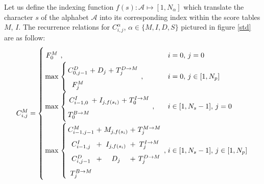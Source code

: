 \documentclass[a4paper,10pt,twoside]{scrartcl}
\newcommand{\A}{\mathcal{A}}
\begin{document}
Let us define the indexing function $f(s): \A \mapsto [1,N_\alpha]$ which translate the character $s$ of the alphabet $\A$ 
into its corresponding index within the score tables $M$, $I$.   
The recurrence relations for $C^\alpha_{i,j}$, $\alpha \in \{M,I,D,S\}$ pictured in figure \ref{std} are as follow:
\begin{equation} \label{std1} \arraycolsep=1.4pt\def\arraystretch{1.7}
	C_{i,j}^{M} = \left \{
		\begin{array}{c l l}
		  F^{M}_0 &,& i = 0,\, j = 0\\
		  
		  \max & \left \{
		  \begin{array} {ccccc}
		  C_{0,j-1}^{D}   &+& D_{j} &+& T^{D \rightarrow M}_j \\
		  F^{M}_j \\
		  \end{array} \right. , & i = 0,\, j \in [1,N_p]\\
		  
		  \max & \left \{
		  \begin{array} {ccccc}
		  C_{i-1,0}^{I}   &+& I_{j, f(s_i)} &+& T^{I \rightarrow M}_0 \\
		  T^{B \rightarrow M}_0 \\
		  \end{array} \right. , & i \in [1,N_s-1],\, j = 0 \\
		
		  \max & \left \{
		  \begin{array} {ccccc}
		  C_{i-1,j-1}^{M} &+& M_{j, f(s_i)} &+& T^{M \rightarrow M}_j \\
		  C_{i-1,j}^{I}   &+& I_{j, f(s_i)} &+& T^{I \rightarrow M}_j \\
		  C_{i,j-1}^{D}   &+& D_{j} &+& T^{D \rightarrow M}_j \\
		  T^{B \rightarrow M}_j \\
		  \end{array} \right. , & i \in [1,N_s-1],\, j \in [1,N_p]\\
		\end{array}
		\right.
\end{equation}
\end{document}
